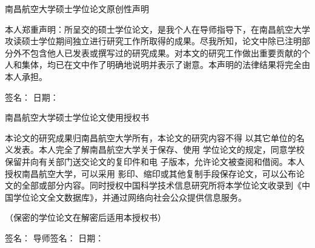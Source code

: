 \documentclass[number, UTF8,12pt, AutoFakeBold,fontset = founder]{ctexart}
\begin{document}
{
\newpage
\thispagestyle{empty}
\thispagestyle{empty}

\begin{center}
    \vspace{21.6pt}
     {\fontsize{18}{21.6}\selectfont\heiti  南昌航空大学硕士学位论文原创性声明}
\end{center}
\vspace{12.6pt}
\begin{spacing}{1.9}
本人郑重声明：所呈交的硕士学位论文，是我个人在导师指导下，在南昌航空大学攻读硕士学位期间独立进行研究工作所取得的成果。尽我所知，论文中除已注明部分外不包含他人已发表或撰写过的研究成果。对本文的研究工作做出重要贡献的个人和集体，均已在文中作了明确地说明并表示了谢意。本声明的法律结果将完全由本人承担。
\end{spacing}

\vspace{16.8pt}
{ 签名：\underline{\hspace{5cm}} \hspace{1cm} 日期：\underline{\hspace{5cm}}}

\vspace{34.2pt}

\begin{center}
    {\fontsize{18}{21.6}\selectfont\heiti  南昌航空大学硕士学位论文使用授权书}
\end{center}
\vspace{16.8pt}
\begin{spacing}{1.9}
本论文的研究成果归南昌航空大学所有，本论文的研究内容不得
以其它单位的名义发表。本人完全了解南昌航空大学关于保存、使用
学位论文的规定，同意学校保留并向有关部门送交论文的复印件和电
子版本，允许论文被查阅和借阅。本人授权南昌航空大学，可以采用
影印、缩印或其他复制手段保存论文，可以公布论文的全部或部分内容。同时授权中国科学技术信息研究所将本学位论文收录到《中国学位论文全文数据库》，并通过网络向社会公众提供信息服务。
\end{spacing}

{（保密的学位论文在解密后适用本授权书）}

\vspace{16.8pt}
{ \noindent
签名：\underline{\hspace{3cm}} 导师签名：\underline{\hspace{3cm}} 日期：\underline{\hspace{3cm}}}

}
\end{document}
